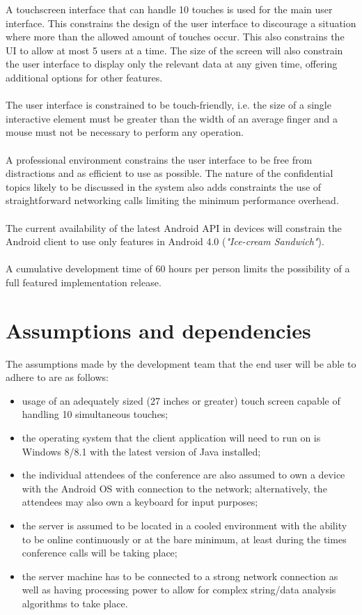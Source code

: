 \documentclass[12p, a4paper, onecolumn]{report}
\begin{document}
A touchscreen interface that can handle 10 touches is used for the main user interface. This constrains the design of the user interface to discourage a situation where more than the allowed amount of touches occur. This also constrains the UI to allow at most 5 users at a time. The size of the screen will also constrain the user interface to display only the relevant data at any given time, offering additional options for other features. \\ \\
The user interface is constrained to be touch-friendly, i.e. the size of a single interactive element must be greater than the width of an average finger and a mouse must not be necessary to perform any operation. \\ \\
A professional environment constrains the user interface to be free from distractions and as efficient to use as possible. The nature of the confidential topics likely to be discussed in the system also adds constraints the use of straightforward networking calls limiting the minimum performance overhead. \\ \\
The current availability of the latest Android API in devices will constrain the Android client to use only features in Android 4.0 (\emph{"Ice-cream Sandwich"}). \\ \\
A cumulative development time of 60 hours per person limits the possibility of a full featured implementation release. 

\section{Assumptions and dependencies}

The assumptions made by the development team that the end user will be able to adhere to are as follows:
\begin{itemize}
\item usage of an adequately sized (27 inches or greater) touch screen capable of handling 10 simultaneous touches;
\item the operating system that the client application will need to run on is Windows 8/8.1 with the latest version of Java installed;
\item the individual attendees of the conference are also assumed to own a device with the Android OS with connection to the network; alternatively, the attendees may also own a keyboard for input purposes;
\item the server is assumed to be located in a cooled environment with the ability to be online continuously or at the bare minimum, at least during the times conference calls will be taking place;
\item the server machine has to be connected to a strong network connection as well as having processing power to allow for complex string/data analysis algorithms to take place. 
\end{itemize}
\end{document}
